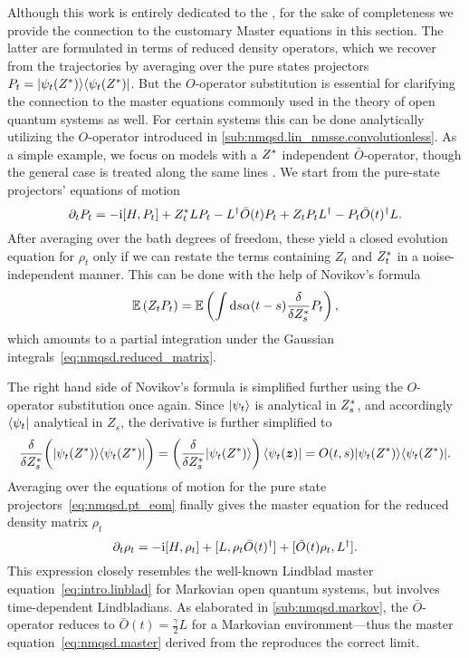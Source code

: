 Although this work is entirely dedicated to the \NMSSE, for the sake of completeness we provide the connection to the customary Master equations in this section.
The latter are formulated in terms of reduced density operators, which we recover from the trajectories by averaging over the pure states projectors $P_t = | \psi_t({Z}^*) \rangle\langle \psi_t({Z}^*) |$.
But the $O$-operator substitution is essential for clarifying the connection to the master equations commonly used in the theory of open quantum systems as well.
For certain systems this can be done analytically utilizing the $O$-operator introduced in \autoref{sub:nmqsd.lin_nmsse.convolutionless}.
As a simple example, we focus on models with a ${Z}^*$ independent $\bar O$-operator, though the general case is treated along the same lines \cite{YuDiGiSt99_pertubation,YuDiGi00_master}.
We start from the pure-state projectors' equations of motion
\begin{equation}
  \partial_t P_t = -\mathrm{i} [H, P_t] + {Z}^*_t L P_t - L^\dagger\bar O(t)P_t + Z_t P_t L^\dagger - P_t \bar O(t)^\dagger L.
  \label{eq:nmqsd.pt_eom}
\end{equation}
After averaging over the bath degrees of freedom, these yield a closed evolution equation for $\rho_t$ only if we can restate the terms containing $Z_t$ and ${Z}^*_t$ in a noise-independent manner.
This can be done with the help of Novikov's formula \cite{No65_functionals}
\begin{equation}
  \E[Z_t P_t] = \E[\intdd s \alpha(t - s) \frac{\delta}{\delta \ZZ_s} P_t],
  \label{eq:nmqsd.novikov}
\end{equation}
which amounts to a partial integration under the Gaussian integrals~\ref{eq:nmqsd.reduced_matrix}.

The right hand side of Novikov's formula is simplified further using the $O$-operator substitution once again.
Since $| \psi_t \rangle$ is analytical in ${Z}^*_s$, and accordingly $\langle \psi_t |$ analytical in $Z_s$, the derivative is further simplified to
\begin{equation*}
  \frac{\delta}{\delta {Z}^*_s} \bigg( | \psi_t({Z}^*) \rangle\langle \psi_t({Z}^*) | \bigg) = \left( \frac{\delta}{\delta {Z}^*_s} | \psi_t({Z}^*) \rangle \right)\langle \psi_t(\boldsymbol{z}) | = O(t, s) | \psi_t({Z}^*) \rangle\langle \psi_t({Z}^*) |.
\end{equation*}
Averaging over the equations of motion for the pure state projectors~\ref{eq:nmqsd.pt_eom} finally gives the master equation for the reduced density matrix $\rho_t$
\begin{equation}
  \partial_t \rho_t = -\mathrm{i} [H, \rho_t]  +  [L, \rho_t \bar O(t)^\dagger]  +  [\bar O(t) \rho_t, L^\dagger].
  \label{eq:nmqsd.master}
\end{equation}
This expression closely resembles the well-known Lindblad master equation~\ref{eq:intro.linblad} for Markovian open quantum systems, but involves time-dependent Lindbladians.
As elaborated in \autoref{sub:nmqsd.markov}, the $\bar O$-operator reduces to $\bar O(t) = \frac{\gamma}{2} L$ for a Markovian environment---thus the master equation~\ref{eq:nmqsd.master} derived from the \NMSSE reproduces the correct limit.


